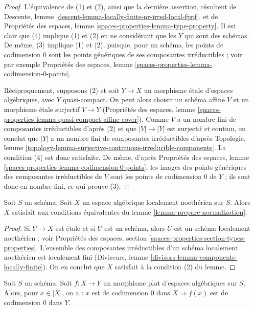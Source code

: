 \begin{proof}
L'équivalence de (1) et (2), ainsi que la dernière assertion, résultent de
Descente, lemme \ref{descent-lemma-locally-finite-nr-irred-local-fppf}, et de
Propriétés des espaces, lemme \ref{spaces-properties-lemma-type-property}.
Il est clair que (4) implique (1) et (2) en ne considérant que les $Y$
qui sont des schémas. De même, (3) implique (1) et (2), puisque, pour un schéma,
les points de codimension $0$ sont les points génériques de ses
composantes irréductibles ; voir par exemple
Propriétés des espaces, lemme \ref{spaces-properties-lemma-codimension-0-points}.

\medskip\noindent
Réciproquement, supposons (2) et soit $Y \to X$ un morphisme étale d'espaces
algébriques, avec $Y$ quasi-compact. On peut alors choisir un schéma
affine $V$ et un morphisme étale surjectif $V \to Y$
(Propriétés des espaces, lemme
\ref{spaces-properties-lemma-quasi-compact-affine-cover}).
Comme $V$ a un nombre fini de composantes irréductibles d'après (2) et que
$|V| \to |Y|$ est surjectif et continu, on conclut que
$|Y|$ a un nombre fini de composantes irréductibles d'après Topologie, lemme
\ref{topology-lemma-surjective-continuous-irreducible-components}.
La condition (4) est donc satisfaite. De même, d'après
Propriétés des espaces, lemme \ref{spaces-properties-lemma-codimension-0-points},
les images des points génériques des composantes irréductibles de $V$
sont les points de codimension $0$ de $Y$ ; ils sont donc
en nombre fini, ce qui prouve (3).
\end{proof}

\begin{lemma}
\label{lemma-locally-noetherian-can-be-normalized}
Soit $S$ un schéma. Soit $X$ un espace algébrique localement noethérien
sur $S$. Alors $X$ satisfait aux conditions équivalentes du
lemme \ref{lemma-prepare-normalization}.
\end{lemma}

\begin{proof}
Si $U \to X$ est étale et si $U$ est un schéma, alors $U$ est un schéma
localement noethérien ; voir Propriétés des espaces, section
\ref{spaces-properties-section-types-properties}.
L'ensemble des composantes irréductibles d'un schéma localement noethérien est
localement fini (Diviseurs, lemme \ref{divisors-lemma-components-locally-finite}).
On en conclut que $X$ satisfait à la condition (2) du lemme.
\end{proof}

\begin{lemma}
\label{lemma-flat-image-point-codimension-0}
Soit $S$ un schéma. Soit $f : X \to Y$ un morphisme plat d'espaces
algébriques sur $S$. Alors, pour $x \in |X|$, on a : $x$ est de codimension $0$ dans
$X \Rightarrow f(x)$ est de codimension $0$ dans $Y$.
\end{lemma}

